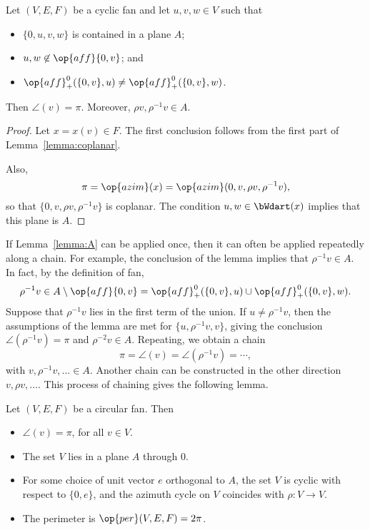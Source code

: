 \begin{lemma} \label{lemma:A}  Let $(V,E,F)$ be a cyclic fan and let
$u,v,w\in V$ such that
\begin{itemize}
\item $\{0,u,v,w\}$ is contained in a plane $A$; \vspace{3pt}
\item $u,w\not\in\op{aff}\{0,v\}$; and \vspace{3pt}
\item $\op{aff}^0_+(\{0,v\},u) \ne \op{aff}^0_+(\{0,v\},w)$.
\end{itemize}
Then $\angle(v) = \pi$.  Moreover, $\rho v,\rho^{-1} v\in A$.
\end{lemma}

\begin{proof} Let $x = x(v)\in F$.  The first conclusion follows from the first part of Lemma~\ref{lemma:coplanar}.  

Also,
$$
\pi=\op{azim}(x) = \op{azim}(0,v,\rho v,\rho^{-1}v),
$$
so that $\{0,v,\rho v,\rho^{-1} v\}$ is coplanar.  The condition
 $u,w\in \bWdart(x)$ implies that this plane is $A$.
\end{proof}

If Lemma~\ref{lemma:A} can be applied once, then it can often be applied repeatedly along a chain.  For example, the conclusion of the lemma implies
that $\rho^{-1} v \in A$.  In fact, by the definition of fan, 
$$\rho^{-1}v \in A \setminus \op{aff}\{0,v\} = \op{aff}^0_+(\{0,v\},u) \cup \op{aff}^0_+(\{0,v\},w).$$
Suppose that $\rho^{-1} v$ lies in the first term of the union.  If $u\ne \rho^{-1}v$, then the assumptions of the lemma
are met for $\{u,\rho^{-1} v,v\}$, giving the conclusion $\angle(\rho^{-1} v)=\pi$ and $\rho^{-2}v\in A$.  Repeating, we obtain a chain
$$
\pi=\angle(v) = \angle(\rho^{-1} v) = \cdots,
$$
with $v,\rho^{-1}v,\ldots\in A$.  Another chain can be constructed in the other direction $v,\rho v,\ldots$.
This process of chaining gives the following lemma.

\begin{lemma}\label{lemma:circular}
Let $(V,E,F)$ be a circular fan. Then
\begin{itemize}
\item $\angle(v)=\pi$, for all $v\in V$.
\item The set $V$ lies in a plane $A$ through $0$.
\item For some choice of unit vector $e$ orthogonal to $A$, the set $V$ is cyclic with respect to
$\{0,e\}$, and the azimuth cycle on $V$ coincides with $\rho:V\to V$.
\item The perimeter is $\op{per}(V,E,F) =2\pi$.
\end{itemize}
\end{lemma}


